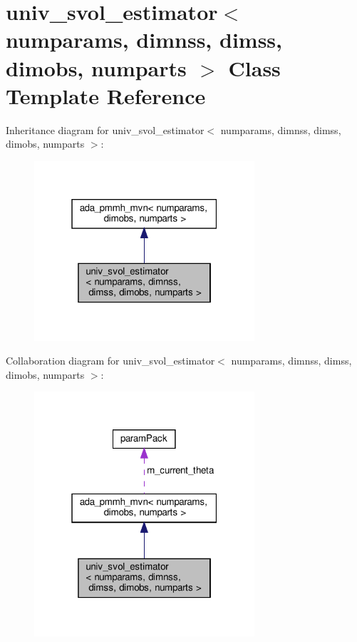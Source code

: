 \hypertarget{classuniv__svol__estimator}{}\section{univ\+\_\+svol\+\_\+estimator$<$ numparams, dimnss, dimss, dimobs, numparts $>$ Class Template Reference}
\label{classuniv__svol__estimator}


Inheritance diagram for univ\+\_\+svol\+\_\+estimator$<$ numparams, dimnss, dimss, dimobs, numparts $>$\+:
\nopagebreak
\begin{figure}[H]
\begin{center}
\leavevmode
\includegraphics[width=232pt]{classuniv__svol__estimator__inherit__graph}
\end{center}
\end{figure}


Collaboration diagram for univ\+\_\+svol\+\_\+estimator$<$ numparams, dimnss, dimss, dimobs, numparts $>$\+:
\nopagebreak
\begin{figure}[H]
\begin{center}
\leavevmode
\includegraphics[width=232pt]{classuniv__svol__estimator__coll__graph}
\end{center}
\end{figure}
